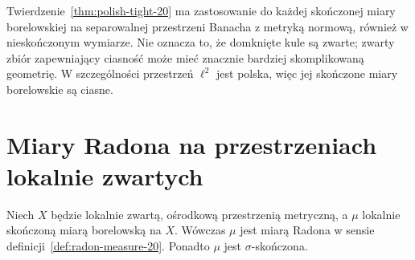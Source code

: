 \begin{przyklad}
Twierdzenie~\ref{thm:polish-tight-20} ma zastosowanie
do każdej skończonej miary borelowskiej na separowalnej
przestrzeni Banacha z metryką normową, również w nieskończonym
wymiarze. Nie oznacza to, że domknięte kule są zwarte;
zwarty zbiór zapewniający ciasność może mieć znacznie
bardziej skomplikowaną geometrię. W szczególności
przestrzeń $\ell^2$ jest polska, więc jej skończone
miary borelowskie są ciasne.
\end{przyklad}

\section{Miary Radona na przestrzeniach lokalnie zwartych}
\begin{twierdzenie}
\label{thm:lch-secondcountable-radon-20}
Niech $X$ będzie lokalnie zwartą, ośrodkową
przestrzenią metryczną, a $\mu$ lokalnie skończoną
miarą borelowską na $X$. Wówczas $\mu$ jest miarą
Radona w sensie definicji~\ref{def:radon-measure-20}.
Ponadto $\mu$ jest $\sigma$-skończona.
\end{twierdzenie}
